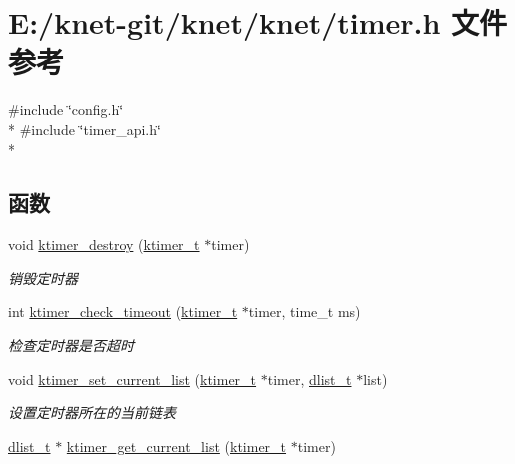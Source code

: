 \hypertarget{a00095}{}\section{E\+:/knet-\/git/knet/knet/timer.h 文件参考}
\label{a00095}
{\ttfamily \#include \char`\"{}config.\+h\char`\"{}}\\*
{\ttfamily \#include \char`\"{}timer\+\_\+api.\+h\char`\"{}}\\*
\subsection*{函数}
\begin{DoxyCompactItemize}
\item 
void \hyperlink{a00095_af64f93b32c31cd222c02f0ad40bb642c_af64f93b32c31cd222c02f0ad40bb642c}{ktimer\+\_\+destroy} (\hyperlink{a00050_a846172ea4e8a86449eca41a3d8e074b7_a846172ea4e8a86449eca41a3d8e074b7}{ktimer\+\_\+t} $\ast$timer)
\begin{DoxyCompactList}\small\item\em 销毁定时器 \end{DoxyCompactList}\item 
int \hyperlink{a00095_a6e263963404ff40c8d7865ba117d3446_a6e263963404ff40c8d7865ba117d3446}{ktimer\+\_\+check\+\_\+timeout} (\hyperlink{a00050_a846172ea4e8a86449eca41a3d8e074b7_a846172ea4e8a86449eca41a3d8e074b7}{ktimer\+\_\+t} $\ast$timer, time\+\_\+t ms)
\begin{DoxyCompactList}\small\item\em 检查定时器是否超时 \end{DoxyCompactList}\item 
void \hyperlink{a00095_a7c448e677f3022e5e7d910d3961dda61_a7c448e677f3022e5e7d910d3961dda61}{ktimer\+\_\+set\+\_\+current\+\_\+list} (\hyperlink{a00050_a846172ea4e8a86449eca41a3d8e074b7_a846172ea4e8a86449eca41a3d8e074b7}{ktimer\+\_\+t} $\ast$timer, \hyperlink{a00050_ad6644d67df4b4e3596c1eb12977d1d16_ad6644d67df4b4e3596c1eb12977d1d16}{dlist\+\_\+t} $\ast$list)
\begin{DoxyCompactList}\small\item\em 设置定时器所在的当前链表 \end{DoxyCompactList}\item 
\hyperlink{a00050_ad6644d67df4b4e3596c1eb12977d1d16_ad6644d67df4b4e3596c1eb12977d1d16}{dlist\+\_\+t} $\ast$ \hyperlink{a00095_ad43b4e56bb273f1559d13143a783c974_ad43b4e56bb273f1559d13143a783c974}{ktimer\+\_\+get\+\_\+current\+\_\+list} (\hyperlink{a00050_a846172ea4e8a86449eca41a3d8e074b7_a846172ea4e8a86449eca41a3d8e074b7}{ktimer\+\_\+t} $\ast$timer)

\end{DoxyCompactItemize}

